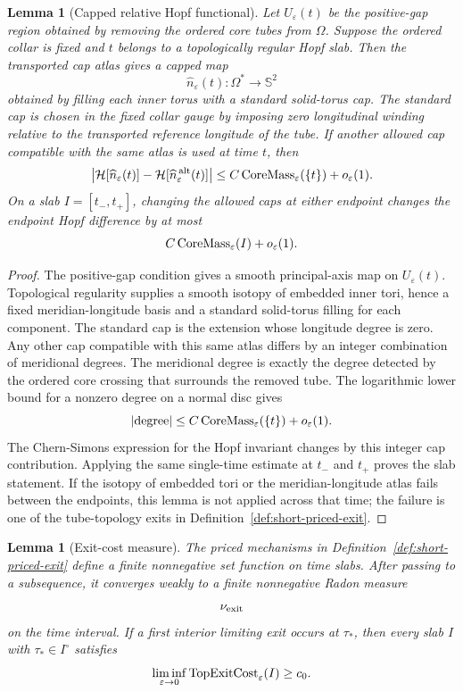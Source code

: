 \documentclass[11pt]{article}
\newtheorem{lemma}[theorem]{Lemma}
\theoremstyle{definition}
\newcommand{\Sph}{\mathbb S}
\newcommand{\eps}{\varepsilon}
\newcommand{\Hopf}{\mathcal H}
\begin{document}
\begin{lemma}[Capped relative Hopf functional]
\label{lem:short-capped-hopf}
Let \(U_\eps(t)\) be the positive-gap region obtained by removing the ordered
core tubes from \(\Omega\).  Suppose the ordered collar is fixed and \(t\)
belongs to a topologically regular Hopf slab.  Then the transported cap atlas
gives a capped map
\[
        \widehat n_\eps(t):\Omega^\ast\to\Sph^2
\]
obtained by filling each inner torus with a standard solid-torus cap.  The
standard cap is chosen in the fixed collar gauge by imposing zero longitudinal
winding relative to the transported reference longitude of the tube.  If
another allowed cap compatible with the same atlas is used at time \(t\), then
\[
        \left|
        \Hopf[\widehat n_\eps(t)]
        -
        \Hopf[\widehat n_\eps^{\,{\rm alt}}(t)]
        \right|
        \le
        C\,{\rm CoreMass}_\eps(\{t\})
        +
        o_\eps(1).
\]
On a slab \(I=[t_-,t_+]\), changing the allowed caps at either endpoint changes
the endpoint Hopf difference by at most
\[
        C\,{\rm CoreMass}_\eps(I)+o_\eps(1).
\]
\end{lemma}

\begin{proof}
The positive-gap condition gives a smooth principal-axis map on
\(U_\eps(t)\).  Topological regularity supplies a smooth isotopy of embedded
inner tori, hence a fixed meridian-longitude basis and a standard solid-torus
filling for each component.  The standard cap is the extension whose longitude
degree is zero.  Any other cap compatible with this same atlas differs by an
integer combination of meridional degrees.  The meridional degree is exactly the
degree detected by the ordered core crossing that surrounds the removed tube.
The logarithmic lower bound for a nonzero degree on a normal disc gives
\[
        |{\rm degree}|
        \le
        C\,{\rm CoreMass}_\eps(\{t\})
        +
        o_\eps(1).
\]
The Chern-Simons expression for the Hopf invariant changes by this integer
cap contribution.  Applying the same single-time estimate at \(t_-\) and
\(t_+\) proves the slab statement.  If the isotopy of embedded tori or the
meridian-longitude atlas fails between the endpoints, this lemma is not applied
across that time; the failure is one of the tube-topology exits in
Definition~\ref{def:short-priced-exit}.
\end{proof}

\begin{lemma}[Exit-cost measure]
\label{lem:short-exit-measure}
The priced mechanisms in Definition~\ref{def:short-priced-exit} define a finite
nonnegative set function on time slabs.  After passing to a subsequence, it
converges weakly to a finite nonnegative Radon measure
\[
        \nu_{\rm exit}
\]
on the time interval.  If a first interior limiting exit occurs at
\(\tau_\ast\), then every slab \(I\) with \(\tau_\ast\in I^\circ\) satisfies
\[
        \liminf_{\eps\to0}
        {\rm TopExitCost}_\eps(I)
        \ge
        c_0 .
\]
\end{lemma}
\end{document}
